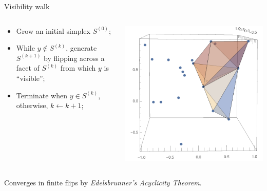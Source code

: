 \documentclass[aspectratio=169]{beamer}
\begin{document}
\begin{frame}{Visibility walk}
\begin{columns}
\begin{column}{.48\textwidth}
\begin{itemize}
\item Grow an initial simplex $S^{(0)}$;
\item While $y \not\in S^{(k)}$, generate $S^{(k+1)}$ by flipping
across a facet of $S^{(k)}$ from which $y$ is ``visible'';
\item Terminate when $y\in S^{(k)}$, otherwise, $k \leftarrow k+1$;
\end{itemize}
\end{column}
\begin{column}{.48\textwidth}
\includegraphics[width=\textwidth]{DelaunayWalk.pdf}
\end{column}
\end{columns}
\medskip
Converges in finite flips by {\it Edelsbrunner's Acyclicity Theorem}.
\end{frame}
\end{document}
